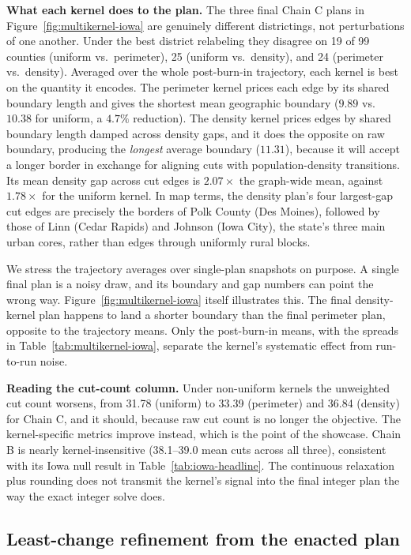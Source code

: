 \documentclass[11pt]{article}
\begin{document}
\textbf{What each kernel does to the plan.} The three final Chain C
plans in Figure~\ref{fig:multikernel-iowa} are genuinely different
districtings, not perturbations of one another. Under the best
district relabeling they disagree on 19 of 99 counties (uniform vs.\
perimeter), 25 (uniform vs.\ density), and 24 (perimeter vs.\
density). Averaged over the whole post-burn-in trajectory, each
kernel is best on the quantity it encodes. The perimeter kernel
prices each edge by its shared boundary length and gives the shortest
mean geographic boundary ($9.89$ vs.\ $10.38$ for uniform, a $4.7\%$
reduction). The density kernel prices edges by shared boundary length
damped across density gaps, and it does the opposite on raw boundary,
producing the \emph{longest} average boundary ($11.31$), because it
will accept a longer border in exchange for aligning cuts with
population-density transitions. Its mean density gap across cut edges
is $2.07\times$ the graph-wide mean, against $1.78\times$ for the
uniform kernel. In map terms, the density plan's four largest-gap cut
edges are precisely the borders of Polk County (Des Moines), followed
by those of Linn (Cedar Rapids) and Johnson (Iowa City), the state's
three main urban cores, rather than edges through uniformly rural
blocks.

We stress the trajectory averages over single-plan snapshots on
purpose. A single final plan is a noisy draw, and its boundary and
gap numbers can point the wrong way. Figure~\ref{fig:multikernel-iowa}
itself illustrates this. The final density-kernel plan happens to land
a shorter boundary than the final perimeter plan, opposite to the
trajectory means. Only the post-burn-in means, with the
spreads in Table~\ref{tab:multikernel-iowa}, separate the kernel's
systematic effect from run-to-run noise.

\textbf{Reading the cut-count column.} Under non-uniform
kernels the unweighted cut count worsens, from 31.78 (uniform) to
33.39 (perimeter) and 36.84 (density) for Chain C, and it should, because
raw cut count is no longer the objective. The kernel-specific metrics
improve instead, which is the point of the showcase. Chain B is
nearly kernel-insensitive (38.1--39.0 mean cuts across all three),
consistent with its Iowa null result in
Table~\ref{tab:iowa-headline}. The continuous relaxation plus
rounding does not transmit the kernel's signal into the final integer
plan the way the exact integer solve does.

\subsection{Least-change refinement from the enacted plan}\label{sec:exp-leastchange}
\end{document}
